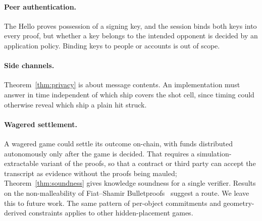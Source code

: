 \documentclass[11pt]{article}
\theoremstyle{definition}
\theoremstyle{remark}
\begin{document}
\paragraph{Peer authentication.}
The Hello proves possession of a signing key, and the session binds both keys into every proof, but whether a key belongs to the intended opponent is decided by an application policy. Binding keys to people or accounts is out of scope.

\paragraph{Side channels.}
Theorem~\ref{thm:privacy} is about message contents. An implementation must answer in time independent of which ship covers the shot cell, since timing could otherwise reveal which ship a plain hit struck.

\paragraph{Wagered settlement.}
A wagered game could settle its outcome on-chain, with funds distributed autonomously only after the game is decided. That requires a simulation-extractable variant of the proofs, so that a contract or third party can accept the transcript as evidence without the proofs being mauled; Theorem~\ref{thm:soundness} gives knowledge soundness for a single verifier. Results on the non-malleability of Fiat--Shamir Bulletproofs~\cite{ganesh} suggest a route. We leave this to future work. The same pattern of per-object commitments and geometry-derived constraints applies to other hidden-placement games.
\end{document}
